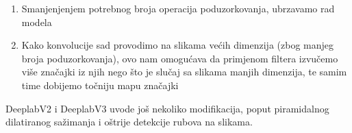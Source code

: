 \begin{enumerate}
  \item Smanjenjenjem potrebnog broja operacija poduzorkovanja, ubrzavamo rad modela
  \item Kako konvolucije sad provodimo na slikama većih dimenzija (zbog manjeg broja poduzorkovanja), ovo nam omogućava da primjenom filtera izvučemo više značajki iz njih nego što je slučaj sa slikama manjih dimenzija, te samim time dobijemo točniju mapu značajki
\end{enumerate}
 
 DeeplabV2 i DeeplabV3 uvode još nekoliko modifikacija, poput piramidalnog dilatiranog sažimanja i oštrije detekcije rubova na slikama.
